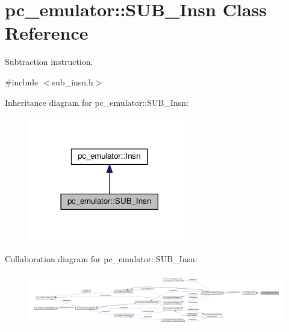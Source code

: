 \hypertarget{classpc__emulator_1_1SUB__Insn}{}\section{pc\+\_\+emulator\+:\+:S\+U\+B\+\_\+\+Insn Class Reference}
\label{classpc__emulator_1_1SUB__Insn}


Subtraction instruction.  




{\ttfamily \#include $<$sub\+\_\+insn.\+h$>$}



Inheritance diagram for pc\+\_\+emulator\+:\+:S\+U\+B\+\_\+\+Insn\+:
\nopagebreak
\begin{figure}[H]
\begin{center}
\leavevmode
\includegraphics[width=201pt]{classpc__emulator_1_1SUB__Insn__inherit__graph}
\end{center}
\end{figure}


Collaboration diagram for pc\+\_\+emulator\+:\+:S\+U\+B\+\_\+\+Insn\+:
\nopagebreak
\begin{figure}[H]
\begin{center}
\leavevmode
\includegraphics[width=350pt]{classpc__emulator_1_1SUB__Insn__coll__graph}
\end{center}
\end{figure}
